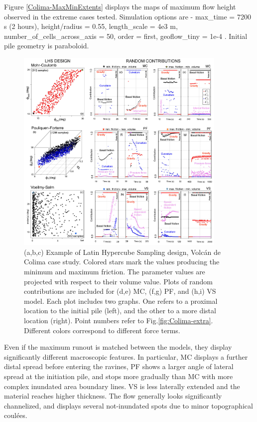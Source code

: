 \documentclass{article}
\begin{document}
Figure \ref{Colima-MaxMinExtents} displays the maps of maximum flow height observed in the extreme cases tested. Simulation options are - max\_time = 7200 s (2 hours), height/radius = 0.55, length\_scale = 4e3 m, number\_of\_cells\_across\_axis = 50, order = first, geoflow\_tiny = 1e-4 \citep{Patra2005,Aghakhani2016}. Initial pile geometry is paraboloid.
\begin{figure}[H]
         \centering
        \includegraphics[width=0.90\textwidth]{figures/Colima/SensitivityFigure.jpg}
        \caption{(a,b,c) Example of Latin Hypercube Sampling design, Volc\'an de Colima case study. Colored stars mark the values producing the minimum and maximum friction. The parameter values are projected with respect to their volume value. Plots of random contributions are included for (d,e) MC, (f,g) PF, and (h,i) VS model. Each plot includes two graphs. One refers to a proximal location to the initial pile (left), and the other to a more distal location (right). Point numbers refer to Fig.\ref{fig:Colima-extra}. Different colors correspond to different force terms.}
        \label{fig:Colima-CC1}
\end{figure}
Even if the maximum runout is matched between the models, they display significantly different macroscopic features. In particular, MC displays a further distal spread before entering the ravines, PF shows a larger angle of lateral spread at the initiation pile, and stops more gradually than MC with more complex inundated area boundary lines. VS is less laterally extended and the material reaches higher thickness. The flow generally looks significantly channelized, and displays several not-inundated spots due to minor topographical coul\'{e}es.
\end{document}
